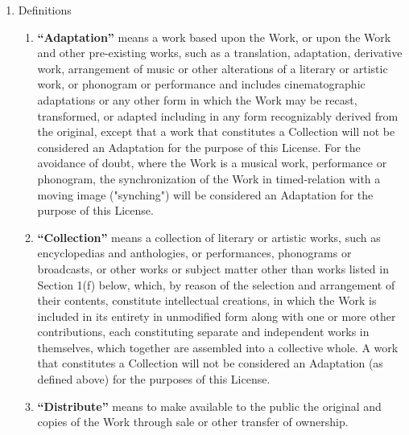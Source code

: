 \begin{enumerate}
    \item Definitions

        \begin{enumerate}
        
            \item \textbf{``Adaptation''} means a work based upon the Work, or
                upon the Work and other pre-existing works, such as a
                translation, adaptation, derivative work, arrangement of music
                or other alterations of a literary or artistic work, or
                phonogram or performance and includes cinematographic
                adaptations or any other form in which the Work may be recast,
                transformed, or adapted including in any form recognizably
                derived from the original, except that a work that constitutes
                a Collection will not be considered an Adaptation for the
                purpose of this License. For the avoidance of doubt, where the
                Work is a musical work, performance or phonogram, the
                synchronization of the Work in timed-relation with a moving
                image ("synching") will be considered an Adaptation for the
                purpose of this License.  

            \item \textbf{``Collection''} means a collection of literary or
                artistic works, such as encyclopedias and anthologies, or
                performances, phonograms or broadcasts, or other works or
                subject matter other than works listed in Section 1(f) below,
                which, by reason of the selection and arrangement of their
                contents, constitute intellectual creations, in which the Work
                is included in its entirety in unmodified form along with one
                or more other contributions, each constituting separate and
                independent works in themselves, which together are assembled
                into a collective whole. A work that constitutes a Collection
                will not be considered an Adaptation (as defined above) for the
                purposes of this License.

            \item \textbf{``Distribute''} means to make available to the public
                the original and copies of the Work through sale or other
                transfer of ownership.  
        

\end{enumerate}
\end{enumerate}
